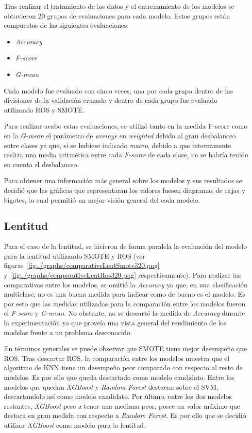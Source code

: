 Tras realizar el tratamiento de los datos y el entrenamiento de los modelos se obtuvieron 20 grupos de evaluaciones para cada modelo. Estos grupos están compuestos de las siguientes evaluaciones:
\begin{itemize}
\item \textit{Accuracy}
\item \textit{F-score}
\item \textit{G-mean}
\end{itemize}
Cada modelo fue evaluado con cinco veces, una por cada grupo dentro de las divisiones de la validación cruzada y dentro de cada grupo fue evaluado utilizando ROS y SMOTE.

Para realizar acabo estas evaluaciones, se utilizó tanto en la medida F-score como en la \textit{G-mean} el parámetro de \textit{average} en \textit{weighted} debido al gran desbalanceo entre clases ya que, si se hubiese indicado \textit{macro}, debido a que internamente realiza una media aritmética entre cada \textit{F-score} de cada clase, no se habría tenido en cuenta el desbalanceo.

Para obtener una información más general sobre los modelos y sus resultados se decidió que las gráficas que representaran los valores fuesen diagramas de cajas y bigotes, lo cual permitió un mejor visión general del cada modelo.

\subsection{Lentitud}
Para el caso de la lentitud, se hicieron de forma paralela la evaluación del modelo para la lentitud utilizando SMOTE y ROS (ver figuras~\ref{fig:./graphs/comparativeLentSmote320.png} y~\ref{fig:./graphs/comparativeLentRos320.png} respectivamente).
Para realizar las comparativas entre los modelos, se omitió la \textit{Accuracy} ya que, en una clasificación multiclase, no es una buena medida para indicar como de bueno es el modelo. Es por esto que las medidas utilizadas para la comparación entre los modelos fueron el \textit{F-score} y \textit{G-mean}. No obstante, no se descartó la medida de \textit{Accuracy} durante la experimentación ya que proveía una vista general del rendimiento de los modelos frente a un problema desconocido.

En términos generales se puede observar que SMOTE tiene mejor desempeño que ROS. Tras descartar ROS, la comparación entre los modelos muestra que el algoritmo de KNN tiene un desempeño peor comparado con respecto al resto de modelos. Es por ello que queda descartado como modelo candidato. Entre los modelos que quedan \textit{XGBoost} y \textit{Random Forest} destacan sobre el SVM, descartandolo así como modelo candidato. Por último, entre los dos modelos restantes, \textit{XGBoost} pese a tener una mediana peor, posee un valor máximo que destaca en gran medida con respecto a \textit{Random Forest}. Es por ello que se decidió utilizar \textit{XGBoost} como modelo para la lentitud.

